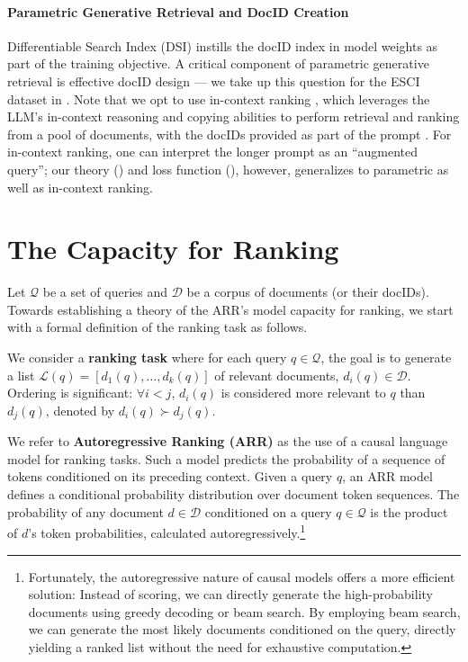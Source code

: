 \documentclass[11pt, a4paper, onecolumn, confidential, copyright, gdm]{google}
\begin{document}
\vspace{-0.6em}
\paragraph{Parametric Generative Retrieval and DocID Creation} Differentiable Search Index (DSI) \citep{tay2022transformer} instills the docID index in model weights as part of the training objective. A critical component of parametric generative retrieval is effective docID design \citep{li2023multiview} — we take up this question for the ESCI dataset in . Note that we opt to use in-context ranking \citep{gupta2025scalable}, which leverages the LLM's in-context reasoning and copying abilities to perform retrieval and ranking from a pool of documents, with the docIDs provided as part of the prompt \cite{wang2024large}. For in-context ranking, one can interpret the longer prompt as an ``augmented query''; our theory () and loss function (), however, generalizes to parametric as well as in-context ranking.

\section{The Capacity for Ranking}\label{sec:capacity-for-ranking}

Let $\mathcal{Q}$ be a set of queries and $\mathcal{D}$ be a corpus of documents (or their docIDs).
Towards establishing a theory of the ARR's model capacity for ranking, we start with a formal definition of the ranking task as follows.
\begin{definition}
    We consider a \textbf{ranking task} where for each query $q \in \mathcal{Q}$, the goal is to generate a list $\mathscr{L}(q)  = [d_1(q), \ldots, d_k(q)]$ of relevant documents, $d_i(q) \in \mathcal{D}$. Ordering is significant: $\forall i < j$, $d_i(q)$ is considered more relevant to $q$ than $d_j(q)$, denoted by $d_i(q) \succ d_j(q)$.
\end{definition}

We refer to \textbf{Autoregressive Ranking (ARR)} as the use of a causal language model for ranking tasks.  Such a model predicts the probability of a sequence of tokens conditioned on its preceding context. Given a query $q$, an ARR model defines a conditional probability distribution over document token sequences. The probability of any document $d \in \mathcal{D}$ conditioned on a query $q \in \mathcal{Q}$ is the product of $d$'s token probabilities, calculated autoregressively.\footnote{Fortunately, the autoregressive nature of causal models offers a more efficient solution: Instead of scoring, we can directly generate the high-probability documents using greedy decoding or beam search. By employing beam search, we can generate the most likely documents conditioned on the query, directly yielding a ranked list without the need for exhaustive computation.} 
\end{document}
